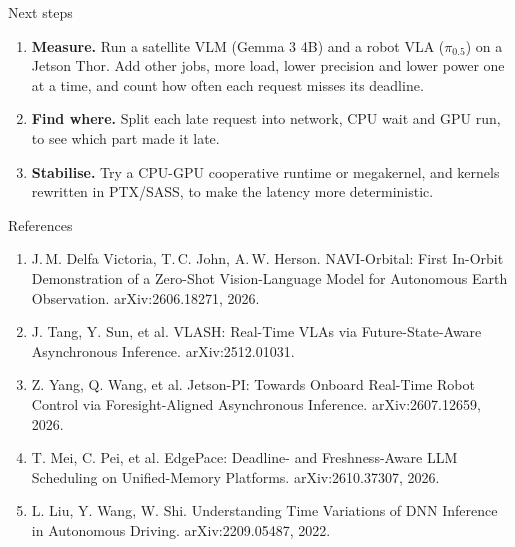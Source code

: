 \documentclass[11pt,aspectratio=169]{beamer}
\begin{document}
\begin{frame}{Next steps}

\vspace{0.2cm}
\begin{enumerate}
  \setlength{\itemsep}{1.1em}
  \item \textbf{Measure.} Run a satellite VLM (Gemma 3 4B) and a robot VLA ($\pi_{0.5}$) on a Jetson Thor. Add other jobs, more load, lower precision and lower power one at a time, and count how often each request misses its deadline. %
  \item \textbf{Find where.} Split each late request into network, CPU wait and GPU run, to see which part made it late. %
  \item \textbf{Stabilise.} Try a CPU-GPU cooperative runtime or megakernel, and kernels rewritten in PTX/SASS, to make the latency more deterministic. %
\end{enumerate}

\end{frame}

\begin{frame}{References}

\footnotesize
\begin{enumerate}
  \setlength{\itemsep}{0.5em}
  \item[{[1]}] J.\,M. Delfa Victoria, T.\,C. John, A.\,W. Herson. NAVI-Orbital: First In-Orbit Demonstration of a Zero-Shot Vision-Language Model for Autonomous Earth Observation. arXiv:2606.18271, 2026.
  \item[{[2]}] J. Tang, Y. Sun, et al. VLASH: Real-Time VLAs via Future-State-Aware Asynchronous Inference. arXiv:2512.01031.
  \item[{[3]}] Z. Yang, Q. Wang, et al. Jetson-PI: Towards Onboard Real-Time Robot Control via Foresight-Aligned Asynchronous Inference. arXiv:2607.12659, 2026.
  \item[{[4]}] T. Mei, C. Pei, et al. EdgePace: Deadline- and Freshness-Aware LLM Scheduling on Unified-Memory Platforms. arXiv:2610.37307, 2026.
  \item[{[5]}] L. Liu, Y. Wang, W. Shi. Understanding Time Variations of DNN Inference in Autonomous Driving. arXiv:2209.05487, 2022.
\end{enumerate}

\end{frame}
\end{document}
